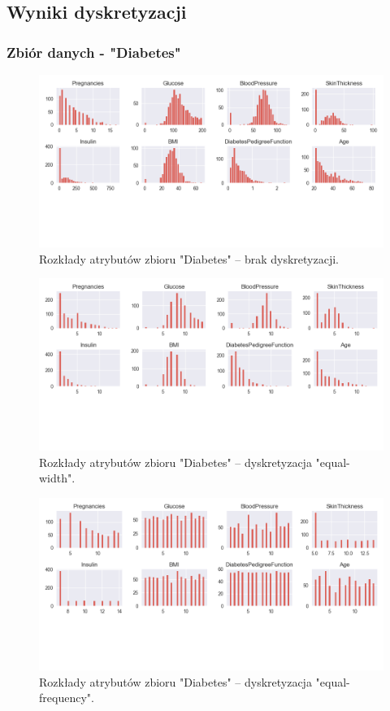 \subsection{Wyniki dyskretyzacji}


\subsubsection{Zbiór danych - "Diabetes"}
    \begin{figure}[H]
        \includegraphics[width=\textwidth]{img/discretization/non_discretized_diabetes.png}
        \caption{Rozkłady atrybutów zbioru "Diabetes" -- brak dyskretyzacji.}
    \end{figure}

    \begin{figure}[H]
        \includegraphics[width=\textwidth]{img/discretization/ew_diabetes.png}
        \caption{Rozkłady atrybutów zbioru "Diabetes" -- dyskretyzacja "equal-width".}
    \end{figure}

    \begin{figure}[H]
        \includegraphics[width=\textwidth]{img/discretization/ef_diabetes.png}
        \caption{Rozkłady atrybutów zbioru "Diabetes" -- dyskretyzacja "equal-frequency".}
    \end{figure}

